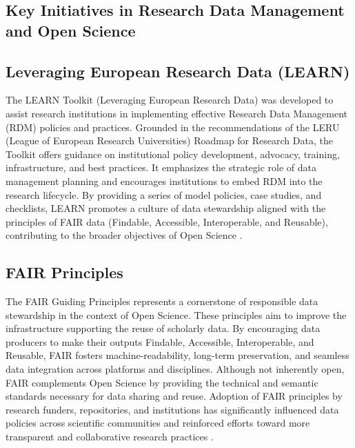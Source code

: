 \documentclass{article}
\begin{document}
\subsection{Key Initiatives in Research Data Management and Open Science}

\subsection{Leveraging European Research Data (LEARN)}
The LEARN Toolkit (Leveraging European Research Data) was developed to assist research institutions in implementing effective Research Data Management (RDM) policies and practices. Grounded in the recommendations of the LERU (League of European Research Universities) Roadmap for Research Data, the Toolkit offers guidance on institutional policy development, advocacy, training, infrastructure, and best practices. It emphasizes the strategic role of data management planning and encourages institutions to embed RDM into the research lifecycle. By providing a series of model policies, case studies, and checklists, LEARN promotes a culture of data stewardship aligned with the principles of FAIR data (Findable, Accessible, Interoperable, and Reusable), contributing to the broader objectives of Open Science \cite{learn_2017}.

\subsection{FAIR Principles}
The FAIR Guiding Principles represents a cornerstone of responsible data stewardship in the context of Open Science. These principles aim to improve the infrastructure supporting the reuse of scholarly data. By encouraging data producers to make their outputs Findable, Accessible, Interoperable, and Reusable, FAIR fosters machine-readability, long-term preservation, and seamless data integration across platforms and disciplines. Although not inherently open, FAIR complements Open Science by providing the technical and semantic standards necessary for data sharing and reuse. Adoption of FAIR principles by research funders, repositories, and institutions has significantly influenced data policies across scientific communities and reinforced efforts toward more transparent and collaborative research practices \cite{wilkinson_fair_2016}.
\end{document}
